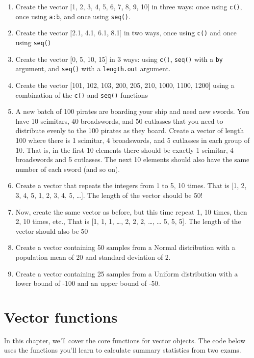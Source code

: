 \documentclass[]{book}
\theoremstyle{definition}
\theoremstyle{definition}
\theoremstyle{remark}
\begin{document}
\begin{enumerate}
\def\labelenumi{\arabic{enumi}.}
\item
  Create the vector {[}1, 2, 3, 4, 5, 6, 7, 8, 9, 10{]} in three ways:
  once using \texttt{c()}, once using \texttt{a:b}, and once using
  \texttt{seq()}.
\item
  Create the vector {[}2.1, 4.1, 6.1, 8.1{]} in two ways, once using
  \texttt{c()} and once using \texttt{seq()}
\item
  Create the vector {[}0, 5, 10, 15{]} in 3 ways: using \texttt{c()},
  \texttt{seq()} with a \texttt{by} argument, and \texttt{seq()} with a
  \texttt{length.out} argument.
\item
  Create the vector {[}101, 102, 103, 200, 205, 210, 1000, 1100, 1200{]}
  using a combination of the \texttt{c()} and \texttt{seq()} functions
\item
  A new batch of 100 pirates are boarding your ship and need new swords.
  You have 10 scimitars, 40 broadswords, and 50 cutlasses that you need
  to distribute evenly to the 100 pirates as they board. Create a vector
  of length 100 where there is 1 scimitar, 4 broadswords, and 5
  cutlasses in each group of 10. That is, in the first 10 elements there
  should be exactly 1 scimitar, 4 broadswords and 5 cutlasses. The next
  10 elements should also have the same number of each sword (and so
  on).
\item
  Create a vector that repeats the integers from 1 to 5, 10 times. That
  is {[}1, 2, 3, 4, 5, 1, 2, 3, 4, 5, \ldots{}{]}. The length of the
  vector should be 50!
\item
  Now, create the same vector as before, but this time repeat 1, 10
  times, then 2, 10 times, etc., That is {[}1, 1, 1, \ldots{}, 2, 2, 2,
  \ldots{}, \ldots{} 5, 5, 5{]}. The length of the vector should also be
  50
\item
  Create a vector containing 50 samples from a Normal distribution with
  a population mean of 20 and standard deviation of 2.
\item
  Create a vector containing 25 samples from a Uniform distribution with
  a lower bound of -100 and an upper bound of -50.
\end{enumerate}

\chapter{Vector functions}\label{vectorfunctions}

In this chapter, we'll cover the core functions for vector objects. The
code below uses the functions you'll learn to calculate summary
statistics from two exams.
\end{document}
